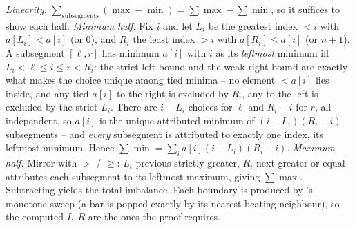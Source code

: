\begin{proofbox}
\emph{Linearity.} $\sum_{\text{subsegments}}(\max-\min)=\sum\max-\sum\min$, so it suffices to show each
half. \emph{Minimum half.} Fix $i$ and let $L_i$ be the greatest index $<i$ with $a[L_i]<a[i]$ (or $0$),
and $R_i$ the least index $>i$ with $a[R_i]\le a[i]$ (or $n+1$). A subsegment $[\ell,r]$ has minimum
$a[i]$ with $i$ as its \emph{leftmost} minimum iff $L_i<\ell\le i\le r<R_i$: the strict left bound and the
weak right bound are exactly what makes the choice unique among tied minima -- no element $<a[i]$ lies
inside, and any tied $a[i]$ to the right is excluded by $R_i$, any to the left is excluded by the strict
$L_i$. There are $i-L_i$ choices for $\ell$ and $R_i-i$ for $r$, all independent, so $a[i]$ is the unique
attributed minimum of $(i-L_i)(R_i-i)$ subsegments -- and \emph{every} subsegment is attributed to exactly
one index, its leftmost minimum. Hence $\sum\min=\sum_i a[i](i-L_i)(R_i-i)$. \emph{Maximum half.} Mirror
with $>$ / $\ge$: $L_i$ previous strictly greater, $R_i$ next greater-or-equal attributes each subsegment to
its leftmost maximum, giving $\sum\max$. Subtracting yields the total imbalance. Each boundary is produced
by 's monotone sweep (a bar is popped exactly by its nearest beating neighbour),
so the computed $L,R$ are the ones the proof requires. \end{proofbox}

